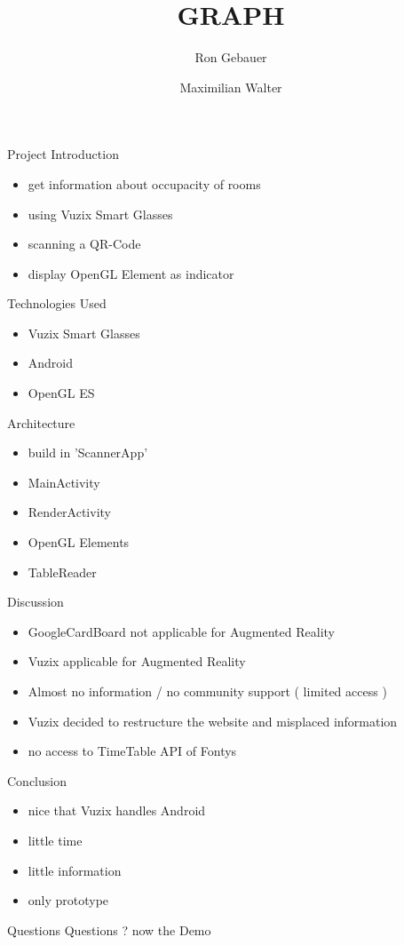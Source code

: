 \documentclass[11pt]{beamer}
\author{Ron Gebauer \and Maximilian Walter}
\title{GRAPH}
\institute{Fontys Hogeschool}
\begin{document}
\begin{frame}
\titlepage
\end{frame}

\begin{frame}{Project Introduction}
\begin{itemize}
\item get information about occupacity of rooms
\item using Vuzix Smart Glasses
\item scanning a QR-Code
\item display OpenGL Element as indicator 
\end{itemize}
\end{frame}
\begin{frame}{Technologies Used}
\begin{itemize}
\item Vuzix Smart Glasses
\item Android
\item OpenGL ES
\end{itemize}
\end{frame}
\begin{frame}{Architecture}
\begin{itemize}
\item build in 'ScannerApp'
\item MainActivity
\item RenderActivity
\item OpenGL Elements
\item TableReader
\end{itemize}
\end{frame}

\begin{frame}{Discussion}

\begin{itemize}
\item GoogleCardBoard not applicable for Augmented Reality
\item Vuzix applicable for Augmented Reality
\item Almost no information / no community support ( limited access )
\item Vuzix decided to restructure the website and misplaced information
\item no access to TimeTable API of Fontys
\end{itemize}
\end{frame}
\begin{frame} {Conclusion}
\begin{itemize}
\item nice that Vuzix handles Android
\item little time
\item little information
\item only prototype
\end{itemize}
\end{frame}
\begin{frame} {Questions}
Questions ? \newline
\pause
now the Demo  
\end{frame}
\end{document}
